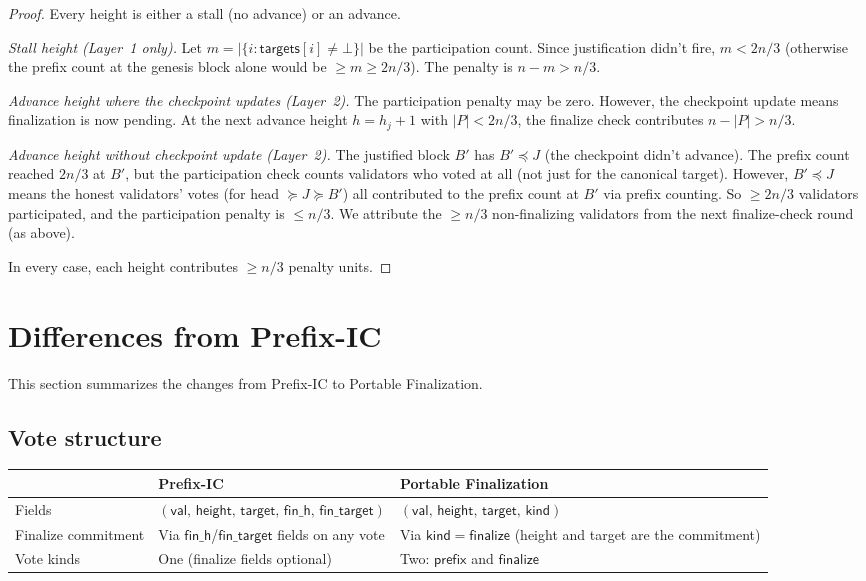 \documentclass{article}
\newcommand{\target}{\mathsf{target}}
\newcommand{\targets}{\mathsf{targets}}
\newcommand{\kind}{\mathsf{kind}}
\newcommand{\height}{\mathsf{height}}
\newcommand{\finalize}{\mathsf{finalize}}
\newcommand{\prefix}{\mathsf{prefix}}
\newcommand{\fintarget}{\mathsf{fin\_target}}
\newcommand{\val}{\mathsf{val}}
\newcommand{\finh}{\mathsf{fin\_h}}
\theoremstyle{plain}
\theoremstyle{definition}
\theoremstyle{remark}
\begin{document}
\begin{proof}
Every height is either a stall (no advance) or an advance.

\emph{Stall height (Layer~1 only).}
Let $m = |\{i : \targets[i] \neq \bot\}|$ be the participation count.
Since justification didn't fire, $m < 2n/3$ (otherwise the prefix count at the genesis block alone would be $\geq m \geq 2n/3$).
The penalty is $n - m > n/3$.

\emph{Advance height where the checkpoint updates (Layer~2).}
The participation penalty may be zero.
However, the checkpoint update means finalization is now pending.
At the next advance height $h = h_j + 1$ with $|P| < 2n/3$, the finalize check contributes $n - |P| > n/3$.

\emph{Advance height without checkpoint update (Layer~2).}
The justified block $B'$ has $B' \preceq J$ (the checkpoint didn't advance).
The prefix count reached $2n/3$ at $B'$, but the participation check counts validators who voted at all (not just for the canonical target).
However, $B' \preceq J$ means the honest validators' votes (for head $\succeq J \succeq B'$) all contributed to the prefix count at $B'$ via prefix counting.
So $\geq 2n/3$ validators participated, and the participation penalty is $\leq n/3$.
We attribute the $\geq n/3$ non-finalizing validators from the next finalize-check round (as above).

In every case, each height contributes $\geq n/3$ penalty units.
\end{proof}


\appendix
\section{Differences from Prefix-IC}\label{app:diffs-prefixic}

This section summarizes the changes from Prefix-IC to Portable Finalization.

\subsection*{Vote structure}

\begin{center}
\begin{tabularx}{\textwidth}{lXX}
\toprule
& \textbf{Prefix-IC} & \textbf{Portable Finalization} \\
\midrule
Fields & $(\val,\, \height,\, \target,\, \finh,\, \fintarget)$ & $(\val,\, \height,\, \target,\, \kind)$ \\
Finalize commitment & Via $\finh$/$\fintarget$ fields on any vote & Via $\kind = \finalize$ (height and target are the commitment) \\
Vote kinds & One (finalize fields optional) & Two: $\prefix$ and $\finalize$ \\
\bottomrule
\end{tabularx}
\end{center}
\end{document}
